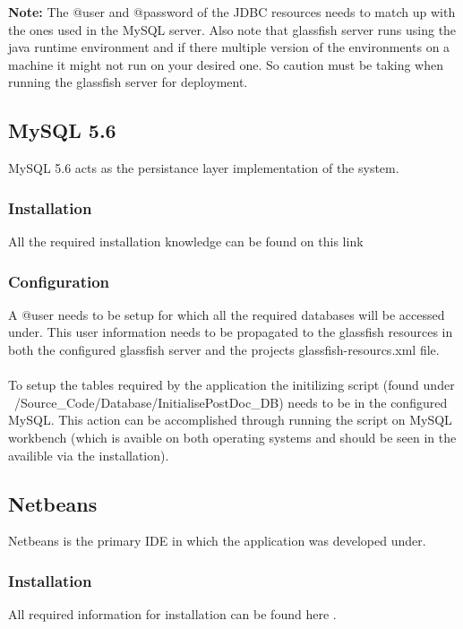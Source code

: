 \documentclass[12pt]{article}
\begin{document}
\textbf{Note:} The @user and @password of the JDBC resources needs to match up with the ones used in the MySQL server. Also note that glassfish server runs using the java runtime environment and if there multiple version of the environments on a machine it might not run on your desired one. So caution must be taking when running the glassfish server for deployment.\\
\subsection{MySQL 5.6}
MySQL 5.6 acts as the persistance layer implementation of the system.

\subsubsection{Installation}
All the required installation knowledge can be found on this link \textbf{} 

\subsubsection{Configuration}
A @user needs to be setup for which all the required databases will be accessed under. This user information needs to be propagated to the glassfish resources in both the configured glassfish server and the projects glassfish-resourcs.xml file.
\\
\\
To setup the tables required by the application the initilizing script (found under ~/Source\_Code/Database/InitialisePostDoc\_DB) needs to be in the configured MySQL. This action can be accomplished through running the script on MySQL workbench (which is avaible on both operating systems and should be seen in the availible via the installation).

\subsection{Netbeans} 
Netbeans is the primary IDE in which the application was developed under.

\subsubsection{Installation}
All required information for installation can be found here \textbf{}.
\end{document}
